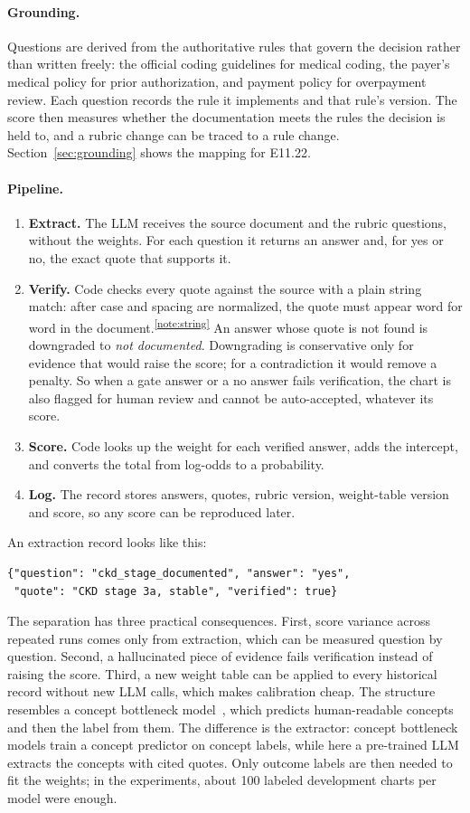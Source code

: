 \documentclass[10pt,letterpaper]{article}
\newcommand{\nd}{\textit{not documented}}
\newcommand{\tnote}[1]{\textsuperscript{\hyperref[note:#1]{\ref*{note:#1}}}}
\begin{document}
\paragraph{Grounding.} Questions are derived from the authoritative rules that govern the decision rather than written freely: the official coding guidelines for medical coding, the payer's medical policy for prior authorization, and payment policy for overpayment review. Each question records the rule it implements and that rule's version. The score then measures whether the documentation meets the rules the decision is held to, and a rubric change can be traced to a rule change. Section~\ref{sec:grounding} shows the mapping for E11.22.

\paragraph{Pipeline.}
\begin{enumerate}
  \item \textbf{Extract.} The LLM receives the source document and the rubric questions, without the weights. For each question it returns an answer and, for yes or no, the exact quote that supports it.
  \item \textbf{Verify.} Code checks every quote against the source with a plain string match: after case and spacing are normalized, the quote must appear word for word in the document.\tnote{string} An answer whose quote is not found is downgraded to \nd. Downgrading is conservative only for evidence that would raise the score; for a contradiction it would remove a penalty. So when a gate answer or a no answer fails verification, the chart is also flagged for human review and cannot be auto-accepted, whatever its score.
  \item \textbf{Score.} Code looks up the weight for each verified answer, adds the intercept, and converts the total from log-odds to a probability.
  \item \textbf{Log.} The record stores answers, quotes, rubric version, weight-table version and score, so any score can be reproduced later.
\end{enumerate}
An extraction record looks like this:
\begin{lstlisting}
{"question": "ckd_stage_documented", "answer": "yes",
 "quote": "CKD stage 3a, stable", "verified": true}
\end{lstlisting}

The separation has three practical consequences. First, score variance across repeated runs comes only from extraction, which can be measured question by question. Second, a hallucinated piece of evidence fails verification instead of raising the score. Third, a new weight table can be applied to every historical record without new LLM calls, which makes calibration cheap. The structure resembles a concept bottleneck model~\cite{cbm}, which predicts human-readable concepts and then the label from them. The difference is the extractor: concept bottleneck models train a concept predictor on concept labels, while here a pre-trained LLM extracts the concepts with cited quotes. Only outcome labels are then needed to fit the weights; in the experiments, about 100 labeled development charts per model were enough.
\end{document}

